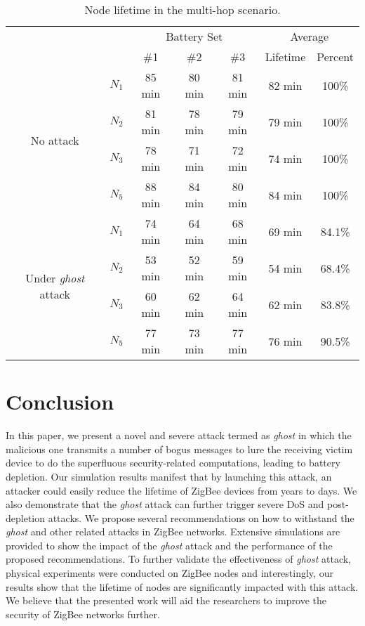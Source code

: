 \documentclass[10pt,journal,cspaper,compsoc]{IEEEtran}
\begin{document}
\begin{table}[ht]
\scriptsize
\caption{Node lifetime in the multi-hop scenario.}
\vspace{-3mm}
\center
\begin{tabular}{c|cccccc}
\toprule
\multicolumn{2}{c}{\multirow{2}{*}{}} & \multicolumn{3}{c}{Battery Set} & \multicolumn{2}{c}{{Average}} \\ \cline{3-7}
  \multicolumn{2}{c}{} & \#1& \#2& \#3& {Lifetime} & {Percent} \\ \hline
  \multirow{4}{*}{\parbox{0.76cm}{No attack}} & $N_1$ & 85 min & 80 min & 81 min & 82 min & 100\%\\ & $N_2$ & 81 min & 78 min & 79 min & 79 min & 100\% \\ & $N_3$ & 78 min & 71 min & 72 min & 74 min & 100\% \\ & $N_5$ & 88 min & 84 min & 80 min & 84 min & 100\% \\ \hline
  \multirow{4}{*}{\parbox{0.76cm}{Under {\em ghost} attack}} & $N_1$ & 74 min & 64 min & 68 min & 69 min & 84.1\%\\ & $N_2$ & 53 min & 52 min & 59 min & 54 min & 68.4\% \\ & $N_3$ & 60 min & 62 min & 64 min & 62 min & 83.8\%\\ & $N_5$ & 77 min & 73 min & 77 min & 76 min & 90.5\% \\ \bottomrule
\end{tabular}\label{experimentdatamultihop}
\end{table}



\section{Conclusion}\label{conclude}
In this paper, we present a novel and severe attack termed as {\em ghost} in which the malicious one transmits a number of bogus messages to lure the receiving victim device to do the superfluous security-related computations, leading to battery depletion. Our simulation results manifest that by launching this attack, an attacker could easily reduce the lifetime of ZigBee devices from years to days. We also demonstrate that the {\em ghost} attack can further trigger severe DoS and post-depletion attacks. We propose several recommendations on how to withstand the {\em ghost}  and other related attacks in ZigBee networks. Extensive simulations are provided to show the impact of the {\em ghost} attack and the performance of the proposed recommendations. To further validate the effectiveness of {\em ghost} attack, physical experiments were conducted on ZigBee nodes and interestingly, our results show that the lifetime of nodes are significantly impacted with this attack. We believe that the presented work will aid the researchers to improve the security of ZigBee networks further.





\end{document}
